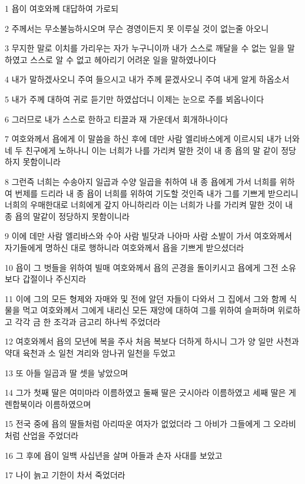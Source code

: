 \par 1 욥이 여호와께 대답하여 가로되
\par 2 주께서는 무소불능하시오며 무슨 경영이든지 못 이루실 것이 없는줄 아오니
\par 3 무지한 말로 이치를 가리우는 자가 누구니이까 내가 스스로 깨달을 수 없는 일을 말하였고 스스로 알 수 없고 헤아리기 어려운 일을 말하였나이다
\par 4 내가 말하겠사오니 주여 들으시고 내가 주께 묻겠사오니 주여 내게 알게 하옵소서
\par 5 내가 주께 대하여 귀로 듣기만 하였삽더니 이제는 눈으로 주를 뵈옵나이다
\par 6 그러므로 내가 스스로 한하고 티끌과 재 가운데서 회개하나이다
\par 7 여호와께서 욥에게 이 말씀을 하신 후에 데만 사람 엘리바스에게 이르시되 내가 너와 네 두 친구에게 노하나니 이는 너희가 나를 가리켜 말한 것이 내 종 욥의 말 같이 정당하지 못함이니라
\par 8 그런즉 너희는 수송아지 일곱과 수양 일곱을 취하여 내 종 욥에게 가서 너희를 위하여 번제를 드리라 내 종 욥이 너희를 위하여 기도할 것인즉 내가 그를 기쁘게 받으리니 너희의 우매한대로 너희에게 갚지 아니하리라 이는 너희가 나를 가리켜 말한 것이 내 종 욥의 말같이 정당하지 못함이니라
\par 9 이에 데만 사람 엘리바스와 수아 사람 빌닷과 나아마 사람 소발이 가서 여호와께서 자기들에게 명하신 대로 행하니라 여호와께서 욥을 기쁘게 받으셨더라
\par 10 욥이 그 벗들을 위하여 빌매 여호와께서 욥의 곤경을 돌이키시고 욥에게 그전 소유보다 갑절이나 주신지라
\par 11 이에 그의 모든 형제와 자매와 및 전에 알던 자들이 다와서 그 집에서 그와 함께 식물을 먹고 여호와께서 그에게 내리신 모든 재앙에 대하여 그를 위하여 슬퍼하며 위로하고 각각 금 한 조각과 금고리 하나씩 주었더라
\par 12 여호와께서 욥의 모년에 복을 주사 처음 복보다 더하게 하시니 그가 양 일만 사천과 약대 육천과 소 일천 겨리와 암나귀 일천을 두었고
\par 13 또 아들 일곱과 딸 셋을 낳았으며
\par 14 그가 첫째 딸은 여미마라 이름하였고 둘째 딸은 긋시아라 이름하였고 세째 딸은 게렌합북이라 이름하였으며
\par 15 전국 중에 욥의 딸들처럼 아리따운 여자가 없었더라 그 아비가 그들에게 그 오라비처럼 산업을 주었더라
\par 16 그 후에 욥이 일백 사십년을 살며 아들과 손자 사대를 보았고
\par 17 나이 늙고 기한이 차서 죽었더라


